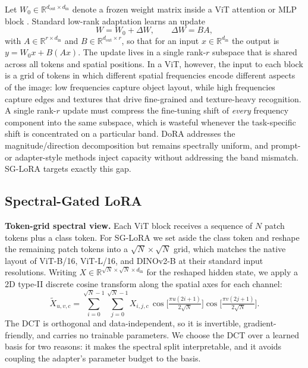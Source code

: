 \documentclass{article}
\begin{document}
Let $W_0 \in \mathbb{R}^{d_{\text{out}} \times d_{\text{in}}}$ denote a frozen
weight matrix inside a ViT attention or MLP block \citep{dosovitskiy2021vit, vaswani2017attention}. Standard low-rank adaptation \citep{hu2022lora}
learns an update
\begin{equation}
  W = W_0 + \Delta W, \qquad \Delta W = B A,
\end{equation}
with $A \in \mathbb{R}^{r \times d_{\text{in}}}$ and
$B \in \mathbb{R}^{d_{\text{out}} \times r}$, so that for an input
$x \in \mathbb{R}^{d_{\text{in}}}$ the output is
$y = W_0 x + B (A x)$. The update lives in a single rank-$r$ subspace that
is shared across all tokens and spatial positions. In a ViT, however,
the input to each block is a grid of tokens in which different spatial
frequencies encode different aspects of the image: low frequencies
capture object layout, while high frequencies capture edges and
textures that drive fine-grained and texture-heavy recognition. A single
rank-$r$ update must compress the fine-tuning shift of \emph{every}
frequency component into the same subspace, which is wasteful whenever
the task-specific shift is concentrated on a particular band. DoRA
\citep{liu2024dora} addresses the magnitude/direction decomposition but
remains spectrally uniform, and prompt- or adapter-style methods
\citep{jia2022vpt, chen2022adaptformer} inject capacity without
addressing the band mismatch. SG-LoRA targets exactly this gap.

\subsection{Spectral-Gated LoRA}

\textbf{Token-grid spectral view.} Each ViT block receives a sequence
of $N$ patch tokens plus a class token. For SG-LoRA we set aside the
class token and reshape the remaining patch tokens into a
$\sqrt{N}\times\sqrt{N}$ grid, which matches the native layout of
ViT-B/16, ViT-L/16, and DINOv2-B at their standard input resolutions.
Writing $X \in \mathbb{R}^{\sqrt{N}\times\sqrt{N}\times d_{\text{in}}}$
for the reshaped hidden state, we apply a 2D type-II discrete cosine
transform along the spatial axes for each channel:
\begin{equation}
  \tilde X_{u,v,c} = \sum_{i=0}^{\sqrt N-1}\sum_{j=0}^{\sqrt N-1}
  X_{i,j,c}\,\cos\!\Big[\tfrac{\pi u (2i+1)}{2\sqrt N}\Big]
  \cos\!\Big[\tfrac{\pi v (2j+1)}{2\sqrt N}\Big].
\end{equation}
The DCT is orthogonal and data-independent, so it is invertible,
gradient-friendly, and carries no trainable parameters. We choose the
DCT over a learned basis for two reasons: it makes the spectral split
interpretable, and it avoids coupling the adapter's parameter budget to
the basis.
\end{document}
